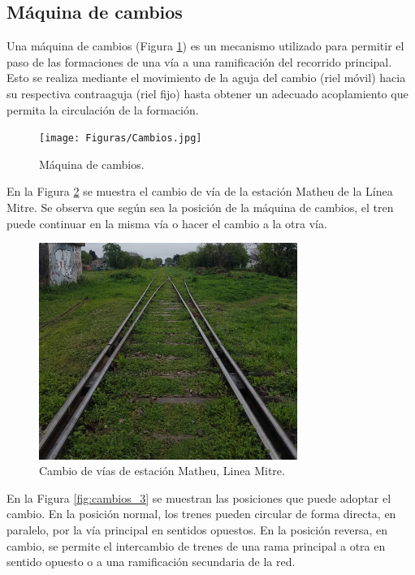 \subsection{Máquina de cambios}
    \label{sec:switches}
 
    Una máquina de cambios (Figura \ref{fig:cambios_1}) es un mecanismo utilizado para permitir el paso de las formaciones de una vía a una ramificación del recorrido principal. Esto se realiza mediante el movimiento de la aguja del cambio (riel móvil) hacia su respectiva contraaguja (riel fijo) hasta obtener un adecuado acoplamiento que permita la circulación de la formación.

    \begin{figure}[H]
        \centering
        \texttt{[image: Figuras/Cambios.jpg]}
        \centering\caption{Máquina de cambios.}
        \label{fig:cambios_1}
    \end{figure}

    En la Figura \ref{fig:cambios_2} se muestra el cambio de vía de la estación Matheu de la Línea Mitre. Se observa que según sea la posición de la máquina de cambios, el tren puede continuar en la misma vía o hacer el cambio a la otra vía.

    \begin{figure}[H]
        \centering
        \includegraphics[width=0.75\textwidth]{Figuras/Cambios_2.jpg}
        \centering\caption{Cambio de vías de estación Matheu, Linea Mitre.}
        \label{fig:cambios_2}
    \end{figure}

    En la Figura \ref{fig:cambios_3} se muestran las posiciones que puede adoptar el cambio. En la posición normal, los trenes pueden circular de forma directa, en paralelo, por la vía principal en sentidos opuestos. En la posición reversa, en cambio, se permite el intercambio de trenes de una rama principal a otra en sentido opuesto o a una ramificación secundaria de la red.

